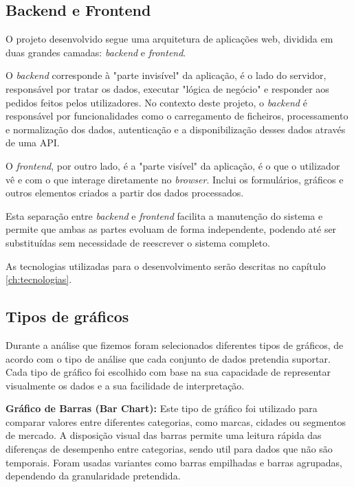 \subsection{Backend e Frontend}

O projeto desenvolvido segue uma arquitetura de aplicações web, dividida em duas grandes camadas: \textit{backend} e \textit{frontend}.

O \textit{backend} corresponde à "parte invisível" da aplicação, é o lado do servidor, responsável por tratar os dados, executar "lógica de negócio" e responder aos pedidos feitos pelos utilizadores. No contexto deste projeto, o \textit{backend} é responsável por funcionalidades como o carregamento de ficheiros, processamento e normalização dos dados,  autenticação e a disponibilização desses dados através de uma API.

O \textit{frontend}, por outro lado, é a "parte visível" da aplicação, é o que o utilizador vê e com o que interage diretamente no \textit{browser}. Inclui os formulários, gráficos e outros elementos criados a partir dos dados processados.

Esta separação entre \textit{backend} e \textit{frontend} facilita a manutenção do sistema e permite que ambas as partes evoluam de forma independente, podendo até ser substituídas sem necessidade de reescrever o sistema completo.

As tecnologias utilizadas para o desenvolvimento serão descritas no capítulo \ref{ch:tecnologias}.

\subsection{Tipos de gráficos}

Durante a análise que fizemos foram selecionados diferentes tipos de gráficos, de acordo com o tipo de análise que cada conjunto de dados pretendia suportar. Cada tipo de gráfico foi escolhido com base na sua capacidade de representar visualmente os dados e a sua facilidade de interpretação.

\textbf{Gráfico de Barras (Bar Chart):}
Este tipo de gráfico foi utilizado para comparar valores entre diferentes categorias, como marcas, cidades ou segmentos de mercado. A disposição visual das barras permite uma leitura rápida das diferenças de desempenho entre categorias, sendo util para dados que não são temporais. Foram usadas variantes como barras empilhadas e barras agrupadas, dependendo da granularidade pretendida.

